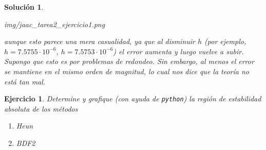 \documentclass[11pt]{article}
\newtheorem{exercise}{Ejercicio}
\newtheorem*{sol}{Solución}
\begin{document}
\begin{sol}
\begin{enumerate}
\begin{center}
      {img/jaac_tarea2_ejercicio1.png}
      \end{center}
      aunque esto parece una mera casualidad, ya que al disminuir $h$ 
      (por ejemplo, $h=7.5755\cdot 10^{-6}$, $h=7.5753\cdot 10^{-6}$)
      el error aumenta y luego vuelve a subir. Supongo que esto es por
      problemas de redondeo. Sin embargo, al menos el error se
      mantiene en el mismo orden de magnitud, lo cual nos dice que la
      teoría no está tan mal.
  \end{enumerate}
\end{sol}

\begin{exercise}
  Determine y grafique (con ayuda de \texttt{python}) la región de
  estabilidad absoluta de los métodos
  \begin{enumerate}
    \item
      Heun
    \item
      BDF2
  \end{enumerate}
\end{exercise}
\end{document}
